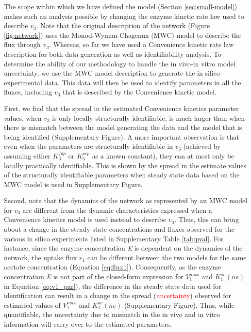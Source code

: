 \documentclass[10pt]{article}
\begin{document}
	The scope within which we have defined the model (Section \ref{sec:small-model}) makes such an analysis possible by changing the enzyme kinetic rate law used to describe $v_3$. Note that the original description \parencite{Kotte2014,Srinivasan2017} of the network (Figure \ref{fig:network}) uses the Monod-Wyman-Chageaux (MWC) model to describe the flux through $v_3$. Whereas, so far we have used a Convenience kinetic rate law description for both data generation as well as identifiability analysis. To determine the ability of our methodology to handle the in vivo-in vitro model uncertainty, we use the MWC model description to generate the in silico experimental data. This data will then be used to identify parameters in all the fluxes, including $v_3$ that is described by the Convenience kinetic model.
	
	First, we find that the spread in the estimated Convenience kinetics parameter values, when $v_3$ is only locally structurally identifiable, is much larger than when there is mismatch between the model generating the data and the model that is being identified (Supplementary Figure). A more important observation is that even when the parameters are structurally identifiable in $v_3$ (achieved by assuming either $K_3^{fdp}$ or $K_3^{pep}$ as a known constant), they can at most only be locally practically identifiable. This is shown by the spread in the estimate values of the structurally identifiable parameters when steady state data based on the MWC model is used in Supplementary Figure.
	
	Second, note that the dynamics of the network as represented by an MWC model for $v_3$ are different from the dynamic characteristics expressed when a Convenience kinetics model is used instead to describe $v_3$. Thus, this can bring about a change in the steady state concentrations and fluxes observed for the various in silico experiments listed in Supplementary Table \ref{tab:pval}. For instance, since the enzyme concentration \textit{E} is dependent on the dynamics of the network, the uptake flux $v_1$ can be different between the two models for the same acetate concentration (Equation \ref{eq:flux1}). Consequently, as the enzyme concentration \textit{E} is not part of the closed-form expression for $V_1^{max}$ and $K_1^{ac}(ne)$ in Equation \ref{eq:v1_par}), the difference in the steady state data used for identification can result in a change in the spread (\textcolor{red}{uncertainty}) observed for estimated values of $V_1^{max}$ and $K_1^{ac}(ne)$ (Supplementary Figure). Thus, while quantifiable, the uncertainty due to mismatch in the in vivo and in vitro information will carry over to the estimated parameters. 
	
\end{document}
